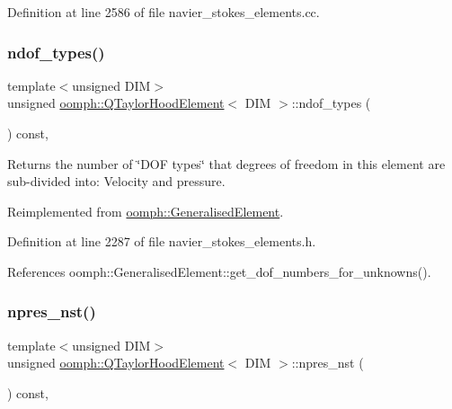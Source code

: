 Definition at line 2586 of file navier\+\_\+stokes\+\_\+elements.\+cc.

\mbox{\label{classoomph_1_1QTaylorHoodElement_a14a90f0ce2b19d79ed9bc9b755e0b2d2}} 
\subsubsection{\texorpdfstring{ndof\+\_\+types()}{ndof\_types()}}
{\footnotesize\ttfamily template$<$unsigned D\+IM$>$ \\
unsigned \hyperlink{classoomph_1_1QTaylorHoodElement}{oomph\+::\+Q\+Taylor\+Hood\+Element}$<$ D\+IM $>$\+::ndof\+\_\+types (\begin{DoxyParamCaption}{ }\end{DoxyParamCaption}) const\hspace{0.3cm}{\ttfamily [inline]}, {\ttfamily [virtual]}}



Returns the number of \char`\"{}\+D\+O\+F types\char`\"{} that degrees of freedom in this element are sub-\/divided into\+: Velocity and pressure. 



Reimplemented from \hyperlink{classoomph_1_1GeneralisedElement_a0c6037a870597b35dcf1c780710b9a56}{oomph\+::\+Generalised\+Element}.



Definition at line 2287 of file navier\+\_\+stokes\+\_\+elements.\+h.



References oomph\+::\+Generalised\+Element\+::get\+\_\+dof\+\_\+numbers\+\_\+for\+\_\+unknowns().

\mbox{\label{classoomph_1_1QTaylorHoodElement_aaf60ebf583d9671f7adddca94e6029ac}} 
\subsubsection{\texorpdfstring{npres\+\_\+nst()}{npres\_nst()}}
{\footnotesize\ttfamily template$<$unsigned D\+IM$>$ \\
unsigned \hyperlink{classoomph_1_1QTaylorHoodElement}{oomph\+::\+Q\+Taylor\+Hood\+Element}$<$ D\+IM $>$\+::npres\+\_\+nst (\begin{DoxyParamCaption}{ }\end{DoxyParamCaption}) const\hspace{0.3cm}{\ttfamily [inline]}, {\ttfamily [virtual]}}




